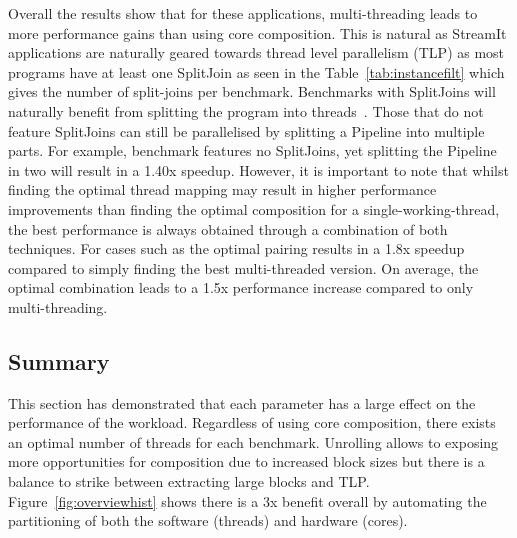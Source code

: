 Overall the results show that for these applications, multi-threading leads to more performance gains than using core composition.
This is natural as StreamIt applications are naturally geared towards thread level parallelism (TLP) as most programs have at least one SplitJoin as seen in the Table~\ref{tab:instancefilt} which gives the number of split-joins per benchmark.
Benchmarks with SplitJoins will naturally benefit from splitting the program into threads~\cite{thiesStreamit2010}.
Those that do not feature SplitJoins can still be parallelised by splitting a Pipeline into multiple parts.
For example, benchmark  features no SplitJoins, yet splitting the Pipeline in two will result in a 1.40x speedup.
However, it is important to note that whilst finding the optimal thread mapping may result in higher performance improvements than finding the optimal composition for a single-working-thread, the best performance is always obtained through a combination of both techniques.
For cases such as  the optimal pairing results in a 1.8x speedup compared to simply finding the best multi-threaded version.
On average, the optimal combination leads to a 1.5x performance increase compared to only multi-threading.

\subsection{Summary}
This section has demonstrated that each parameter has a large effect on the performance of the workload.
Regardless of using core composition, there exists an optimal number of threads for each benchmark.
Unrolling allows to exposing more opportunities for composition due to increased block sizes but there is a balance to strike between extracting large blocks and TLP.
Figure~\ref{fig:overviewhist} shows there is a 3x benefit overall by automating the partitioning of both the software (threads) and hardware (cores).

